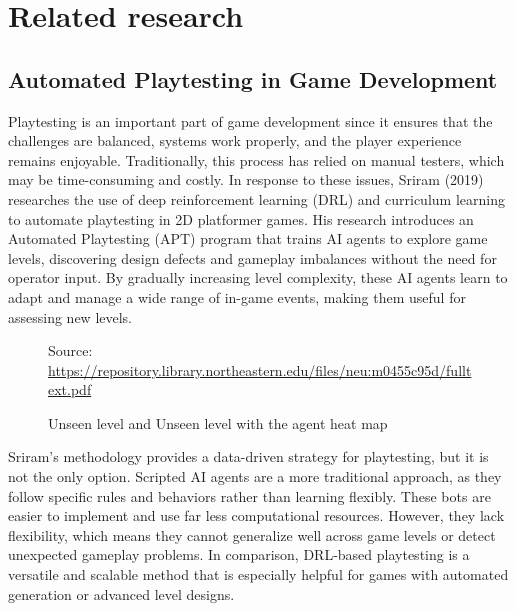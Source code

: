 \documentclass[12pt,oneside,openright,a4paper]{cpe-english-project}
\begin{document}
\section{Related research}

\subsection{Automated Playtesting in Game Development}
Playtesting is an important part of game development since it ensures that the challenges are balanced, systems work properly, and the player experience remains enjoyable. Traditionally, this process has relied on manual testers, which may be time-consuming and costly. In response to these issues, Sriram (2019)\cite {playtesting} researches the use of deep reinforcement learning (DRL) and curriculum learning to automate playtesting in 2D platformer games. His research introduces an Automated Playtesting (APT) program that trains AI agents to explore game levels, discovering design defects and gameplay imbalances without the need for operator input. By gradually increasing level complexity, these AI agents learn to adapt and manage a wide range of in-game events, making them useful for assessing new levels.\par
\begin{figure}[!h]
\centering
{}
\caption{Unseen level and Unseen level with the agent heat map}\label{fig:UnseenLevel}
Source:
\href{https://repository.library.northeastern.edu/files/neu:m0455c95d/fulltext.pdf}{https://repository.library.northeastern.edu/files/neu:m0455c95d/fulltext.pdf} 
\end{figure}
Sriram's methodology provides a data-driven strategy for playtesting, but it is not the only option. Scripted AI agents are a more traditional approach, as they follow specific rules and behaviors rather than learning flexibly. These bots are easier to implement and use far less computational resources. However, they lack flexibility, which means they cannot generalize well across game levels or detect unexpected gameplay problems. In comparison, DRL-based playtesting is a versatile and scalable method that is especially helpful for games with automated generation or advanced level designs.\par
\newpage
\end{document}
